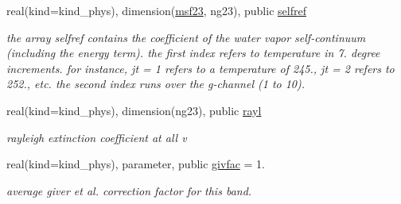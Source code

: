 \begin{Indent}
\begin{DoxyCompactItemize}
real(kind=kind\+\_\+phys), dimension(\hyperlink{group__module__radsw__kgbnn_gab96959c26232963a568609451483843e}{msf23}, ng23), public \hyperlink{group__module__radsw__kgbnn_gae4e51bcb3c3cbaaf1476d5ab18b072e5}{selfref}
\begin{DoxyCompactList}\small\item\em the array selfref contains the coefficient of the water vapor self-\/continuum (including the energy term). the first index refers to temperature in 7. degree increments. for instance, jt = 1 refers to a temperature of 245., jt = 2 refers to 252., etc. the second index runs over the g-\/channel (1 to 10). \end{DoxyCompactList}\item 
real(kind=kind\+\_\+phys), dimension(ng23), public \hyperlink{group__module__radsw__kgbnn_ga40006f284543c7347eced417b9de2fc6}{rayl}
\begin{DoxyCompactList}\small\item\em rayleigh extinction coefficient at all v \end{DoxyCompactList}\item 
real(kind=kind\+\_\+phys), parameter, public \hyperlink{group__module__radsw__kgbnn_ga5f6ced06169db4b7470e20d5639ac54c}{givfac} = 1.
\begin{DoxyCompactList}\small\item\em average giver et al. correction factor for this band. \end{DoxyCompactList}\end{DoxyCompactItemize}
\end{Indent}
